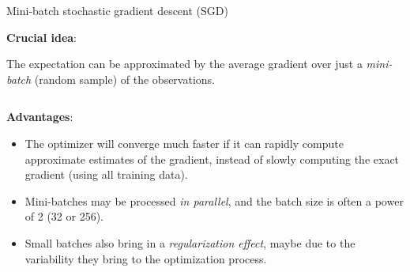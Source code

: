 \documentclass[10pt,ignorenonframetext,]{beamer}
\begin{document}
\begin{frame}

\begin{block}{Mini-batch stochastic gradient descent (SGD)}

\vspace{2mm}

\textbf{Crucial idea}:

The expectation can be approximated by the average gradient over just a
\emph{mini-batch} (random sample) of the observations.

\(~\)

\textbf{Advantages}:

\vspace{1mm}

\begin{itemize}
\item
  The optimizer will converge much faster if it can rapidly compute
  approximate estimates of the gradient, instead of slowly computing the
  exact gradient (using all training data).
\item
  Mini-batches may be processed \emph{in parallel}, and the batch size
  is often a power of 2 (32 or 256).
\item
  Small batches also bring in a \emph{regularization effect}, maybe due
  to the variability they bring to the optimization process.
\end{itemize}

\end{block}

\end{frame}
\end{document}
